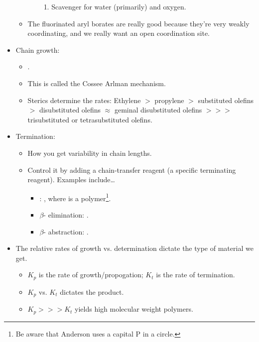 \documentclass[../notes.tex]{subfiles}
\begin{document}
\begin{itemize}
\begin{itemize}
\begin{itemize}
\begin{enumerate}
                \item Scavenger for water (primarily) and oxygen.
            \end{enumerate}
        \end{itemize}
        \item The fluorinated aryl borates are really good because they're very weakly coordinating, and we really want an open coordination site.
    \end{itemize}
    \item Chain growth:
    \begin{itemize}
        \item {}.
        \item This is called the Cossee Arlman mechanism.
        \item Sterics determine the rates: Ethylene $>$ propylene $>$ substituted olefins $>$ disubstituted olefins $\approx$ geminal disubstituted olefins $>>>$ trisubstituted or tetrasubstituted olefins.
    \end{itemize}
    \item Termination:
    \begin{itemize}
        \item How you get variability in chain lengths.
        \item Control it by adding a chain-transfer reagent (a specific terminating reagent). Examples include\dots
        \begin{itemize}
            \item {}: , where  is a polymer\footnote{Be aware that Anderson uses a capital P in a circle.}.
            \item $\beta$- elimination: .
            \item $\beta$- abstraction: .
        \end{itemize}
    \end{itemize}
    \item The relative rates of growth vs. determination dictate the type of material we get.
    \begin{itemize}
        \item $K_p$ is the rate of growth/propogation; $K_t$ is the rate of termination.
        \item $K_p$ vs. $K_t$ dictates the product.
        \item $K_p>>>K_t$ yields high molecular weight polymers.

\end{itemize}
\end{itemize}
\end{document}
